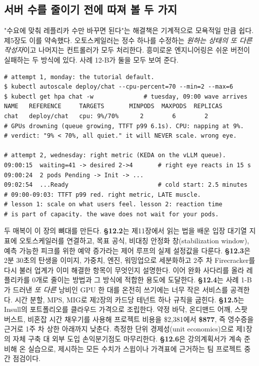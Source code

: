 \subsection*{서버 수를 줄이기 전에 따져 볼 두 가지}

"수요에 맞춰 레플리카 수만 바꾸면 된다"는 해결책은 기계적으로 모욕적일 만큼 쉽다. 제5장도 이를 약속했다. 오토스케일러는 정수 하나를 수정하는 \textit{원하는 상태의 또 다른 작성자}이고 나머지는 컨트롤러가 모두 처리한다. 흥미로운 엔지니어링은 쉬운 버전이 실패하는 두 방식에 있다. 사례 12-B가 둘을 모두 보여 준다.

\begin{terminalbox}
\begin{Verbatim}[breaklines=true,breakanywhere=true,fontsize=\small,formatcom=\color{tbbtermfg},codes=\tbbcodeactive]
# attempt 1, monday: the tutorial default.
$ kubectl autoscale deploy/chat --cpu-percent=70 --min=2 --max=6
$ kubectl get hpa chat -w              # tuesday, 09:00 wave arrives
NAME   REFERENCE     TARGETS       MINPODS  MAXPODS  REPLICAS
chat   deploy/chat   cpu: 9%/70%      2        6        2
# GPUs drowning (queue growing, TTFT p99 6.1s). CPU: napping at 9%.
# verdict: "9% < 70%, all quiet." it will NEVER scale. wrong eye.

# attempt 2, wednesday: right metric (KEDA on the vLLM queue).
09:00:15  waiting=41 -> desired 2->4       # right eye reacts in 15 s
09:00:24  2 pods Pending -> Init -> ...
09:02:54  ...Ready                         # cold start: 2.5 minutes
# 09:00-09:03: TTFT p99 red. right metric, LATE muscle.
# lesson 1: scale on what users feel. lesson 2: reaction time
# is part of capacity. the wave does not wait for your pods.
\end{Verbatim}
\end{terminalbox}

두 매복이 이 장의 뼈대를 만든다. \textbf{§12.2}는 제11장에서 읽는 법을 배운 입장 대기열 지표에 오토스케일러를 연결하고, 목표 공식, 비대칭 안정화 창(stabilization window), 예측 가능한 피크를 위한 예약 증가라는 제어 루프의 실제 설정값을 다룬다. \textbf{§12.3}은 2분 30초의 탄생을 이미지, 가중치, 엔진, 워밍업으로 세분화하고 2주 차 Firecracker를 다시 불러 업계가 이미 해결한 항목이 무엇인지 설명한다. 이어 완화 사다리를 올라 레플리카를 0개로 줄이는 방법과 그 방식에 적합한 용도에 도달한다. \textbf{§12.4}는 사례 1-B가 드러낸 \textit{또 다른} 낭비인 GPU 한 대를 온전히 쓰기에는 너무 작은 서비스를 공격한다. 시간 분할, MPS, MIG로 제2장의 카드당 테넌트 하나 규칙을 굽힌다. \textbf{§12.5}는 Insull의 포트폴리오를 클라우드 가격으로 조립한다. 약정 바닥, 온디맨드 어깨, 스팟 버스트, 비혼잡 시간 채우기를 사용해 프로젝트 비용을 \$2,381에서 \textbf{\$877}, 즉 영수증을 근거로 1주 차 상한 아래까지 낮춘다. 측정한 단위 경제성(unit economics)으로 제1장의 자체 구축 대 외부 도입 손익분기점도 마무리한다. \textbf{§12.6}은 강의계획서가 계속 준비해 온 실습으로, 제시하는 모든 수치가 스윕이나 가격표에 근거하는 팀 프로젝트 중간 점검이다.

